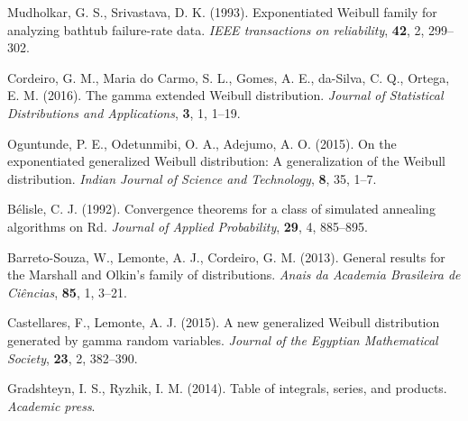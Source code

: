 \documentclass[twoside,leqno,11pt]{article}
\begin{document}
\begin{thebibliography}{8}
 Mudholkar, G. S., Srivastava, D. K. (1993). Exponentiated Weibull family for analyzing bathtub failure-rate data. \textit{IEEE transactions on reliability}, {\bf 42}, 2, 299--302.

 Cordeiro, G. M., Maria do Carmo, S. L., Gomes, A. E., da-Silva, C. Q.,  Ortega, E. M. (2016). The gamma extended Weibull distribution. \textit{Journal of Statistical Distributions and Applications}, {\bf 3}, 1, 1--19.

 Oguntunde, P. E., Odetunmibi, O. A., Adejumo, A. O. (2015). On the exponentiated generalized Weibull distribution: A generalization of the Weibull distribution. \textit{Indian Journal of Science and Technology}, {\bf 8}, 35, 1--7.

 Bélisle, C. J. (1992). Convergence theorems for a class of simulated annealing algorithms on Rd. \textit{Journal of Applied Probability}, {\bf 29}, 4, 885--895.

 Barreto-Souza, W., Lemonte, A. J.,  Cordeiro, G. M. (2013). General results for the Marshall and Olkin's family of distributions. \textit{Anais da Academia Brasileira de Ciências}, {\bf 85}, 1, 3--21.

 Castellares, F., Lemonte, A. J. (2015). A new generalized Weibull distribution generated by gamma random variables. \textit{Journal of the Egyptian Mathematical Society}, {\bf 23}, 2, 382--390.

 Gradshteyn, I. S.,  Ryzhik, I. M. (2014). Table of integrals, series, and products. \textit{Academic press}.
\end{thebibliography}
\end{document}
